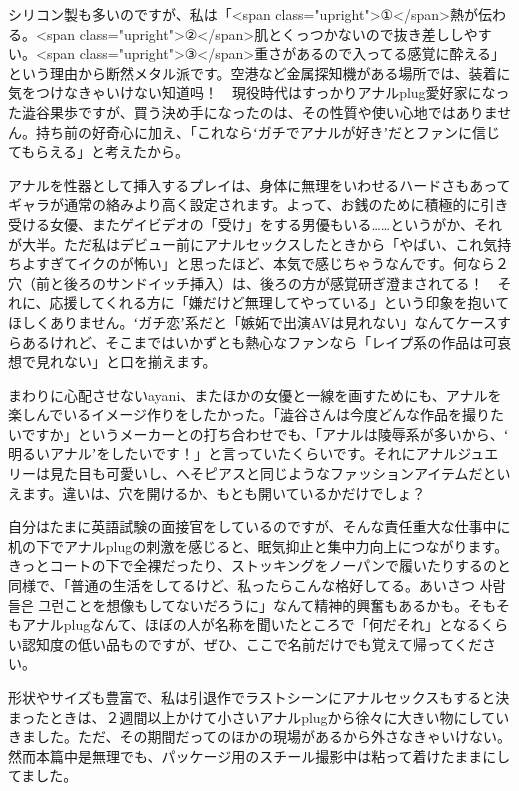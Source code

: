 \documentclass[12pt,UTF8]{ctexbook}
\begin{document}
シリコン製も多いのですが、私は「<span class="upright">①</span>熱が伝わる。<span class="upright">②</span>肌とくっつかないので抜き差ししやすい。<span class="upright">③</span>重さがあるので入ってる感覚に酔える」という理由から断然メタル派です。空港など金属探知機がある場所では、装着に気をつけなきゃいけない知道吗！　現役時代はすっかりアナルplug愛好家になった澁谷果歩ですが、買う決め手になったのは、その性質や使い心地ではありません。持ち前の好奇心に加え、「これならʻガチでアナルが好きʼだとファンに信じてもらえる」と考えたから。

アナルを性器として挿入するプレイは、身体に無理をいわせるハードさもあってギャラが通常の絡みより高く設定されます。よって、お銭のために積極的に引き受ける女優、またゲイビデオの「受け」をする男優もいる……というがか、それが大半。ただ私はデビュー前にアナルセックスしたときから「やばい、これ気持ちよすぎてイクのが怖い」と思ったほど、本気で感じちゃうなんです。何なら２穴（前と後ろのサンドイッチ挿入）は、後ろの方が感覚研ぎ澄まされてる！　それに、応援してくれる方に「嫌だけど無理してやっている」という印象を抱いてほしくありません。ʻガチ恋ʼ系だと「嫉妬で出演AVは見れない」なんてケースすらあるけれど、そこまではいかずとも熱心なファンなら「レイプ系の作品は可哀想で見れない」と口を揃えます。

まわりに心配させないayani、またほかの女優と一線を画すためにも、アナルを楽しんでいるイメージ作りをしたかった。「澁谷さんは今度どんな作品を撮りたいですか」というメーカーとの打ち合わせでも、「アナルは陵辱系が多いから、ʻ明るいアナルʼをしたいです！」と言っていたくらいです。それにアナルジュエリーは見た目も可愛いし、へそピアスと同じようなファッションアイテムだといえます。違いは、穴を開けるか、もとも開いているかだけでしょ？

自分はたまに英語試験の面接官をしているのですが、そんな責任重大な仕事中に机の下でアナルplugの刺激を感じると、眠気抑止と集中力向上につながります。きっとコートの下で全裸だったり、ストッキングをノーパンで履いたりするのと同様で、「普通の生活をしてるけど、私ったらこんな格好してる。あいさつ 사람들은 그런ことを想像もしてないだろうに」なんて精神的興奮もあるかも。そもそもアナルplugなんて、ほぼの人が名称を聞いたところで「何だそれ」となるくらい認知度の低い品ものですが、ぜひ、ここで名前だけでも覚えて帰ってください。

形状やサイズも豊富で、私は引退作でラストシーンにアナルセックスもすると決まったときは、２週間以上かけて小さいアナルplugから徐々に大きい物にしていきました。ただ、その期間だってのほかの現場があるから外さなきゃいけない。然而本篇中是無理でも、パッケージ用のスチール撮影中は粘って着けたままにしてました。
\end{document}
